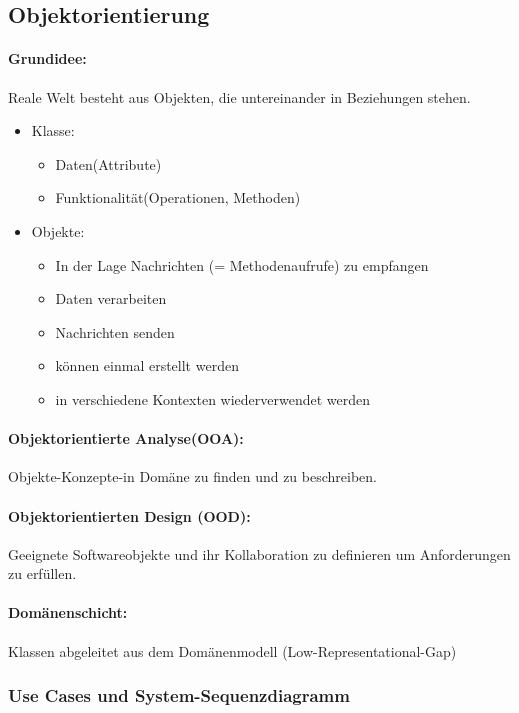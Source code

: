 \documentclass[../ZF_SWEN1.tex]{subfiles}
\begin{document}
\subsection{Objektorientierung}

\paragraph{Grundidee: } Reale Welt besteht aus Objekten, die untereinander in Beziehungen stehen.

\begin{itemize}
	\item Klasse:
	\begin{itemize}
		\item Daten(Attribute)
		\item Funktionalität(Operationen, Methoden)
	\end{itemize}
	\item Objekte:
	\begin{itemize}
		\item In der Lage Nachrichten (= Methodenaufrufe) zu empfangen
		\item Daten verarbeiten
		\item Nachrichten senden
		\item können einmal erstellt werden
		\item in verschiedene Kontexten wiederverwendet werden
	\end{itemize}
\end{itemize}


\paragraph{Objektorientierte Analyse(OOA): } Objekte-Konzepte-in Domäne zu finden und zu beschreiben. \\
\paragraph{Objektorientierten Design (OOD): } Geeignete Softwareobjekte und ihr Kollaboration zu definieren um Anforderungen zu erfüllen.

\paragraph{Domänenschicht: } Klassen abgeleitet aus dem Domänenmodell (Low-Representational-Gap)


\subsubsection{Use Cases und System-Sequenzdiagramm}
\end{document}
